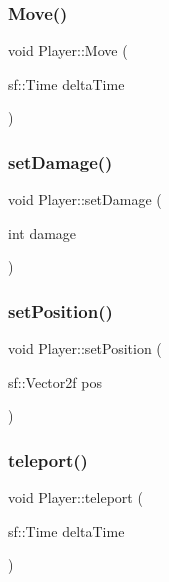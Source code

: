 \mbox{\label{class_player_aab4ff61041f937e6c3d560863fa46f56}} 
\subsubsection{\texorpdfstring{Move()}{Move()}}
{\footnotesize\ttfamily void Player\+::\+Move (\begin{DoxyParamCaption}\item[{sf\+::\+Time}]{delta\+Time }\end{DoxyParamCaption})}

\mbox{\label{class_player_a065d28e46d0660eff17bad53f2efd622}} 
\subsubsection{\texorpdfstring{set\+Damage()}{setDamage()}}
{\footnotesize\ttfamily void Player\+::set\+Damage (\begin{DoxyParamCaption}\item[{int}]{damage }\end{DoxyParamCaption})}

\mbox{\label{class_player_a04a1bb340ea6d425fb2927c397e96e4e}} 
\subsubsection{\texorpdfstring{set\+Position()}{setPosition()}}
{\footnotesize\ttfamily void Player\+::set\+Position (\begin{DoxyParamCaption}\item[{sf\+::\+Vector2f}]{pos }\end{DoxyParamCaption})}

\mbox{\label{class_player_ad975c53e4e2e21b597079e59c1ed0262}} 
\subsubsection{\texorpdfstring{teleport()}{teleport()}}
{\footnotesize\ttfamily void Player\+::teleport (\begin{DoxyParamCaption}\item[{sf\+::\+Time}]{delta\+Time }\end{DoxyParamCaption})}

